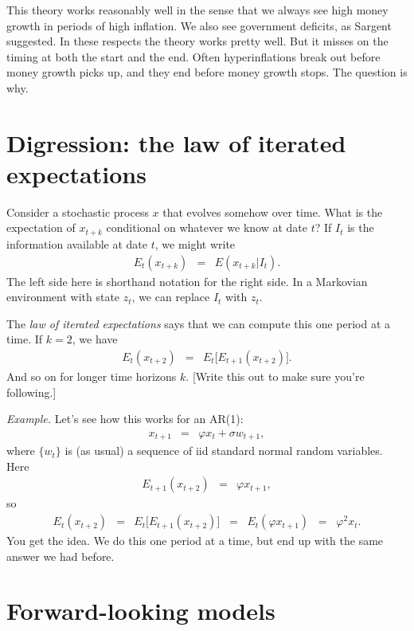 \documentclass[11pt]{article}
\begin{document}
This theory works reasonably well in the sense that we always see high money growth in periods
of high inflation.
We also see government deficits, as Sargent suggested.
In these respects the theory works pretty well.
But it misses on the timing at both the start and the end.
Often hyperinflations break out before money growth picks up,
and they end before money growth stops.
The question is why.


\section{Digression:  the law of iterated expectations}

Consider a stochastic process $x$ that evolves somehow over time.
What is the expectation of $x_{t+k}$ conditional on whatever we know at date $t$?
If $I_t$ is the information available at date $t$, we might write
\begin{eqnarray*}
    E_t (x_{t+k}) &=&  E \left( x_{t+k} | I_t \right) .
\end{eqnarray*}
The left side here is shorthand notation for the right side.
In a Markovian environment with state $z_t$, we can replace $I_t$ with $z_t$.

The {\it law of iterated expectations\/} says that we can compute this one period at
a time.
If $k=2$, we have
\begin{eqnarray*}
    E_t (x_{t+2}) &=&  E_t \big[ E_{t+1} (x_{t+2} ) \big].
\end{eqnarray*}
And so on for longer time horizons $k$.
[Write this out to make sure you're following.]

{\it Example.\/}
Let's see how this works for an AR(1):
\begin{eqnarray*}
    x_{t+1} &=& \varphi x_t + \sigma w_{t+1} ,
\end{eqnarray*}
where $\{ w_t \}$ is (as usual) a sequence of iid standard normal random variables.
Here
\begin{eqnarray*}
    E_{t+1} (x_{t+2}) &=&  \varphi x_{t+1} ,
\end{eqnarray*}
so
\begin{eqnarray*}
    E_{t} (x_{t+2}) &=&  E_t \big[ E_{t+1} (x_{t+2})\big]
        \;\;=\;\; E_t (\varphi x_{t+1})
        \;\;=\;\; \varphi^2 x_{t} .
\end{eqnarray*}
You get the idea.  We do this one period at a time, but end up with the same
answer we had before.



\section{Forward-looking models}
\end{document}
